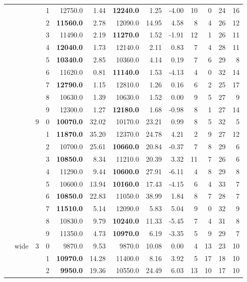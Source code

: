 {\begin{longtable}{llcc|rr|rrr|rrrr}
 &  &  & 1 & 12750.0 & 1.44 & \textbf{12240.0} & 1.25 & -4.00 & 10 & 0 & 24 & 16 \\
 &  &  & 2 & \textbf{11560.0} & 2.78 & 12090.0 & 14.95 & 4.58 & 8 & 4 & 26 & 12 \\
 &  &  & 3 & 11490.0 & 2.19 & \textbf{11270.0} & 1.52 & -1.91 & 12 & 1 & 26 & 11 \\
 &  &  & 4 & \textbf{12040.0} & 1.73 & 12140.0 & 2.11 & 0.83 & 7 & 4 & 28 & 11 \\
 &  &  & 5 & \textbf{10340.0} & 2.85 & 10360.0 & 4.14 & 0.19 & 7 & 6 & 29 & 8 \\
 &  &  & 6 & 11620.0 & 0.81 & \textbf{11140.0} & 1.53 & -4.13 & 4 & 0 & 32 & 14 \\
 &  &  & 7 & \textbf{12790.0} & 1.15 & 12810.0 & 1.26 & 0.16 & 6 & 2 & 25 & 17 \\
 &  &  & 8 & 10630.0 & 1.39 & 10630.0 & 1.52 & 0.00 & 9 & 5 & 27 & 9 \\
 &  &  & 9 & 12300.0 & 1.27 & \textbf{12180.0} & 1.68 & -0.98 & 8 & 1 & 27 & 14 \\ \hline
 &  & 9 & 0 & \textbf{10070.0} & 32.02 & 10170.0 & 23.21 & 0.99 & 8 & 5 & 32 & 5 \\
 &  &  & 1 & \textbf{11870.0} & 35.20 & 12370.0 & 24.78 & 4.21 & 2 & 9 & 27 & 12 \\
 &  &  & 2 & 10700.0 & 25.61 & \textbf{10660.0} & 20.84 & -0.37 & 7 & 8 & 29 & 6 \\
 &  &  & 3 & \textbf{10850.0} & 8.34 & 11210.0 & 20.39 & 3.32 & 11 & 7 & 26 & 6 \\
 &  &  & 4 & 11290.0 & 9.44 & \textbf{10600.0} & 27.91 & -6.11 & 4 & 8 & 29 & 8 \\
 &  &  & 5 & 10600.0 & 13.94 & \textbf{10160.0} & 17.43 & -4.15 & 6 & 4 & 33 & 7 \\
 &  &  & 6 & \textbf{10850.0} & 22.83 & 11050.0 & 38.99 & 1.84 & 8 & 7 & 28 & 7 \\
 &  &  & 7 & \textbf{11510.0} & 5.14 & 12090.0 & 5.83 & 5.04 & 9 & 0 & 32 & 9 \\
 &  &  & 8 & 10830.0 & 9.79 & \textbf{10240.0} & 11.33 & -5.45 & 7 & 4 & 31 & 8 \\
 &  &  & 9 & 11350.0 & 4.73 & \textbf{10970.0} & 6.19 & -3.35 & 5 & 9 & 29 & 7 \\ \hline
 & wide & 3 & 0 & 9870.0 & 9.53 & 9870.0 & 10.08 & 0.00 & 4 & 13 & 23 & 10 \\
 &  &  & 1 & \textbf{10970.0} & 14.28 & 11400.0 & 8.16 & 3.92 & 5 & 17 & 18 & 10 \\
 &  &  & 2 & \textbf{9950.0} & 19.36 & 10550.0 & 24.49 & 6.03 & 13 & 10 & 17 & 10 \\

\end{longtable}}
